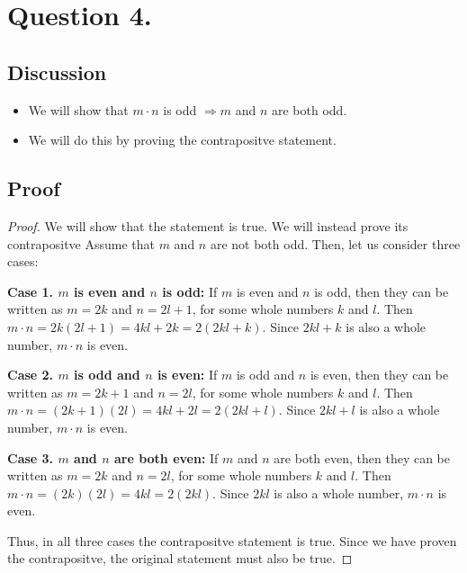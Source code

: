 \documentclass{article}
\begin{document}
    \section*{Question 4.}
    \subsection*{Discussion}
    \begin{itemize}
        \item We will show that $ m \cdot n $ is odd $ \Rightarrow m $ and $ n $ are both odd.
        \item We will do this by proving the contrapositve statement.
    \end{itemize}

    \subsection*{Proof}
    \begin{proof}
        We will show that the statement  is true. We will instead prove its contrapositve 
        Assume that $ m $ and $ n $ are not both odd. Then, let us consider three cases:

        \noindent \textbf{Case 1. $ m $ is even and $ n $ is odd:} If $ m $ is even and $ n $ is odd, then they can be written as $ m = 2k $ and $ n = 2l + 1 $, for some whole numbers $ k $ and $ l $. Then $ m \cdot n = 2k(2l + 1) = 4kl + 2k = 2(2kl + k) $. Since $ 2kl + k $ is
        also a whole number, $ m \cdot n $ is even.

        \noindent \textbf{Case 2. $ m $ is odd and $ n $ is even:} If $ m $ is odd and $ n $ is even, then they can be written as $ m = 2k + 1 $ and $ n = 2l $, for some whole numbers $ k $ and $ l $. Then $ m \cdot n = (2k + 1)(2l) = 4kl + 2l = 2(2kl + l) $. Since $ 2kl + l $ is
        also a whole number, $ m \cdot n $ is even.

        \noindent \textbf{Case 3. $ m $ and $ n $ are both even:} If $ m $ and $ n $ are both even, then they can be written as $ m = 2k $ and $ n = 2l $, for some whole numbers $ k $ and $ l $. Then $ m \cdot n = (2k)(2l) = 4kl = 2(2kl) $. Since $ 2kl $ is
        also a whole number, $ m \cdot n $ is even.

        \noindent Thus, in all three cases the contrapositve statement  is true. Since we have proven the contrapositve, the original statement must also be true.
    \end{proof}
\end{document}
